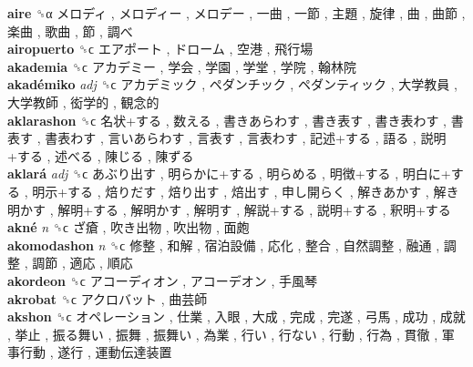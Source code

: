 \textbf{aire} ␝α   メロディ ,  メロディー ,  メロデー ,  一曲 ,  一節 ,  主題 ,  旋律 ,  曲 ,  曲節 ,  楽曲 ,  歌曲 ,  節 ,  調べ   \\
\textbf{airopuerto} ␝ϲ   エアポート ,  ドローム ,  空港 ,  飛行場   \\
\textbf{akademia} ␝ϲ   アカデミー ,  学会 ,  学園 ,  学堂 ,  学院 ,  翰林院   \\
\textbf{akadémiko} \emph{adj}  ␝ϲ   アカデミック ,  ペダンチック ,  ペダンティック ,  大学教員 ,  大学教師 ,  衒学的 ,  観念的   \\
\textbf{aklarashon} ␝ϲ   名状+する ,  数える ,  書きあらわす ,  書き表す ,  書き表わす ,  書表す ,  書表わす ,  言いあらわす ,  言表す ,  言表わす ,  記述+する ,  語る ,  説明+する ,  述べる ,  陳じる ,  陳ずる   \\
\textbf{aklará} \emph{adj}  ␝ϲ   あぶり出す ,  明らかに+する ,  明らめる ,  明徴+する ,  明白に+する ,  明示+する ,  焙りだす ,  焙り出す ,  焙出す ,  申し開らく ,  解きあかす ,  解き明かす ,  解明+する ,  解明かす ,  解明す ,  解説+する ,  説明+する ,  釈明+する   \\
\textbf{akné} \emph{n}  ␝ϲ   ざ瘡 ,  吹き出物 ,  吹出物 ,  面皰   \\
\textbf{akomodashon} \emph{n}  ␝ϲ   修整 ,  和解 ,  宿泊設備 ,  応化 ,  整合 ,  自然調整 ,  融通 ,  調整 ,  調節 ,  適応 ,  順応   \\
\textbf{akordeon} ␝ϲ   アコーディオン ,  アコーデオン ,  手風琴   \\
\textbf{akrobat} ␝ϲ   アクロバット ,  曲芸師   \\
\textbf{akshon} ␝ϲ   オペレーション ,  仕業 ,  入眼 ,  大成 ,  完成 ,  完遂 ,  弓馬 ,  成功 ,  成就 ,  挙止 ,  振る舞い ,  振舞 ,  振舞い ,  為業 ,  行い ,  行ない ,  行動 ,  行為 ,  貫徹 ,  軍事行動 ,  遂行 ,  運動伝達装置   \\
